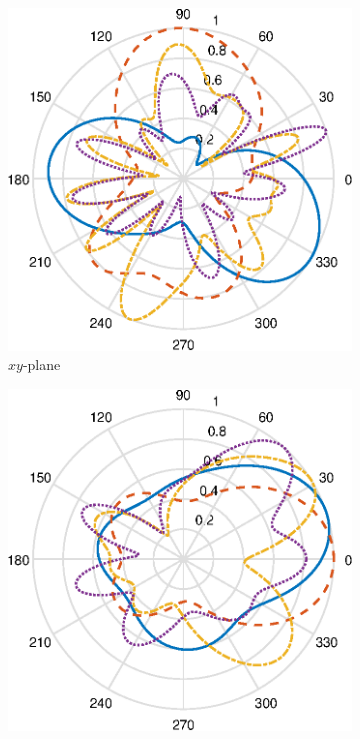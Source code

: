 \begin{figure}[H]
    \begin{subfigure}[b]{0.3\textwidth}
        \includegraphics[width=\textwidth]{img/ff_gpswifi_xy.eps}
        \caption{$xy$-plane}
        \label{fig:ff_xy_gpswifi}
    \end{subfigure}
    \begin{subfigure}[b]{0.3\textwidth}
        \includegraphics[width=\textwidth]{img/ff_gpswifi_xz.eps}

\end{subfigure}
\end{figure}
